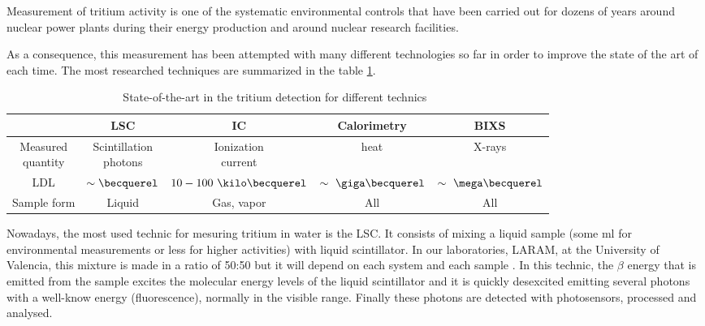 Measurement of tritium activity is one of the systematic environmental controls that have been carried out for dozens of years around nuclear power plants during their energy production and around nuclear research facilities.

As a consequence, this measurement has been attempted with many different technologies so far in order to improve the state of the art of each time. The most researched techniques are summarized in the table \ref{DifferentThecnics}.

\begin{table}[htbp]
\begin{center}
\begin{tabular}{|c|c|c|c|c|}
\hline
 & LSC & IC & Calorimetry & BIXS\\
\hline \hline \hline
\parbox{5em}{\centering Measured\\ quantity} & \parbox{5em}{\centering Scintillation\\ photons} &  \parbox{5em}{\centering Ionization\\ current} & heat & X-rays\\ \hline
LDL & $\sim\becquerel$ & $10-100~\kilo\becquerel$ & $\sim~\giga\becquerel$ & $\sim~\mega\becquerel$ \\ \hline
Sample form & Liquid & Gas, vapor & All & All \\ \hline
\end{tabular}
\caption{State-of-the-art in the tritium detection for different technics~\cite{TesisTritio}}
\label{DifferentThecnics}
\end{center}
\end{table}

Nowadays, the most used technic for mesuring tritium in water is the LSC. It consists of mixing a liquid sample (some ml for environmental measurements or less for higher activities) with liquid scintillator. In our laboratories, LARAM, at the University of Valencia, this mixture is made in a ratio of 50:50 \cite{LSCLARAM} but it will depend on each system and each sample \cite{LSCothers} \cite{HofstetterSeveral}. In this technic, the $\beta$ energy that is emitted from the sample excites the molecular energy levels of the liquid scintillator and it is quickly desexcited emitting several photons with a well-know energy (fluorescence), normally in the visible range. Finally these photons are detected with photosensors, processed and analysed.

